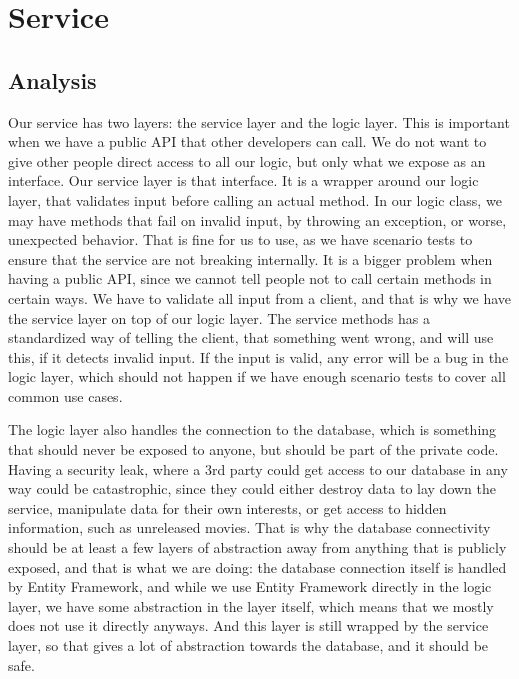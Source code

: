\section{Service}
\label{Design_Service}

\subsection{Analysis}
\label{Design_Service_Analysis}

Our service has two layers: the service layer and the logic layer. This is important when we have a public API that other developers can call. We do not want to give other people direct access to all our logic, but only what we expose as an interface. Our service layer is that interface. It is a wrapper around our logic layer, that validates input before calling an actual method. In our logic class, we may have methods that fail on invalid input, by throwing an exception, or worse, unexpected behavior. That is fine for us to use, as we have scenario tests to ensure that the service are not breaking internally. It is a bigger problem when having a public API, since we cannot tell people not to call certain methods in certain ways. We have to validate all input from a client, and that is why we have the service layer on top of our logic layer. The service methods has a standardized way of telling the client, that something went wrong, and will use this, if it detects invalid input. If the input is valid, any error will be a bug in the logic layer, which should not happen if we have enough scenario tests to cover all common use cases. 

The logic layer also handles the connection to the database, which is something that should never be exposed to anyone, but should be part of the private code. Having a security leak, where a 3rd party could get access to our database in any way could be catastrophic, since they could either destroy data to lay down the service, manipulate data for their own interests, or get access to hidden information, such as unreleased movies. That is why the database connectivity should be at least a few layers of abstraction away from anything that is publicly exposed, and that is what we are doing: the database connection itself is handled by Entity Framework, and while we use Entity Framework directly in the logic layer, we have some abstraction in the layer itself, which means that we mostly does not use it directly anyways. And this layer is still wrapped by the service layer, so that gives a lot of abstraction towards the database, and it should be safe. 

